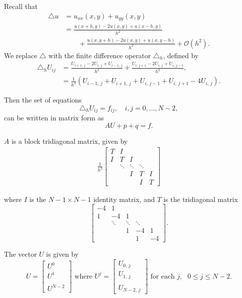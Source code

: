 Recall that
 \begin{align*}
 \triangle u &= u_{xx}(x,y) + u_{yy}(x,y) \\
&= \frac{u(x+h,y) - 2u(x,y)+ u(x-h,y)}{h^2} \\
 & \qquad{}+ 
 \frac{u(x,y+h) - 2u(x,y)+ u(x,y-h)}{h^2} + \mathcal{O}(h^2).
 \end{align*}
 We replace $\triangle $ with the finite difference operator $\triangle_h$, defined by
 \begin{align*}
 \triangle_h U_{ij} &= \frac{U_{i+1,\,j} - 2U_{i,\,j} + U_{i-1,\,j}}{h^2} + \frac{U_{i,\,j+1} - 2U_{i,\,j}+ U_{i,\,j-1}}{h^2},\\
&= \frac{1}{h^2}(U_{i-1,\,j} + U_{i+1,\,j} + U_{i,\,j-1} + U_{i,\,j+1}-4U_{i,\,j}).
 \end{align*}

 Then the set of equations  
\[
\triangle_h U_{ij} = f_{ij}, \quad i,j = 0,\ldots,N-2,
\]%
can be written in matrix form as
 \[AU + p +  q  = f.\]

$A$ is a block tridiagonal matrix, given by 
\begin{align}
	\frac{1}{h^2}
\begin{bmatrix}
T & I & &  &\\
I &T & I & &\\
&\ddots  & \ddots & \ddots & \\
&  & I & T & I \\
&  &  & I & T\end{bmatrix}\label{poisson2d:matrixA}
\end{align}

where $I$ is the $N-1\times N-1$ %
identity matrix, and $T$ is the tridiagonal matrix
\[\begin{bmatrix}
-4 & 1 & &  &\\
1 &-4 & 1 & &\\
&\ddots  & \ddots & \ddots & \\
&  & 1 & -4 & 1 \\
&  &  & 1 & -4 \end{bmatrix}.\]


The vector $U$ is given by 
\[U = \begin{bmatrix} U^0 \\ U^1 \\ \\ U^{N-2} \end{bmatrix} \text{ where } U^j = 
\begin{bmatrix} U_{0,\,j} \\ U_{1,\,j} \\ \\ U_{N-2,\,j} \end{bmatrix} \text{ for each } j, \text{ }0\leq j \leq N-2.\]

